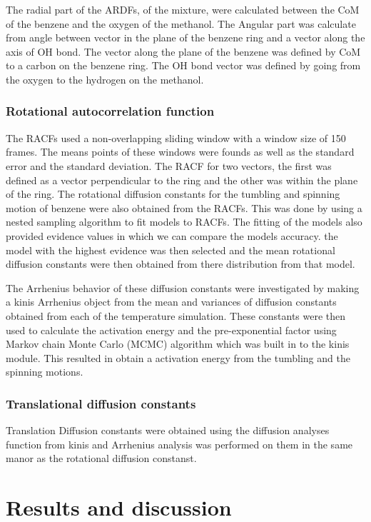 \documentclass{report}
\begin{document}
The radial part of the ARDFs, of the mixture,  were calculated between the CoM of the benzene and the oxygen of the methanol. The Angular part was calculate from angle between vector in the plane of the benzene ring and a vector along the axis of OH bond. The vector along the plane of the benzene was defined by CoM to a carbon on the benzene ring. The OH bond vector was defined by going from the oxygen to the hydrogen on the methanol. 

\subsubsection{Rotational autocorrelation function}

The RACFs used a non-overlapping sliding window with a window size of 150 frames. The means points of these windows were founds as well as the standard error and the standard deviation. The RACF for two vectors, the first was defined as a vector perpendicular to the ring and the other was within the plane of the ring. The rotational diffusion constants for the tumbling and spinning motion of benzene were also obtained from the RACFs. This was done by using a nested sampling algorithm to fit models to RACFs. The fitting of the models also provided evidence values in which we can compare the models accuracy. the model with the highest evidence was then selected and the mean rotational diffusion constants were then obtained from there distribution from that model.

The Arrhenius behavior of these diffusion constants were investigated by making a kinis Arrhenius object from the mean and variances of diffusion constants obtained from each of the temperature simulation. These constants were then used to calculate the activation energy and the pre-exponential factor using Markov chain Monte Carlo (MCMC) algorithm which was built in to the kinis module. This resulted in obtain a activation energy from the tumbling and the spinning motions.

\subsubsection{Translational diffusion constants}

Translation Diffusion constants were obtained using the diffusion analyses function from kinis and Arrhenius analysis was performed on them in the same manor as the rotational diffusion constanst.  

\section{Results and discussion}
\end{document}
